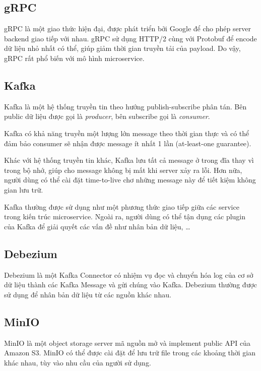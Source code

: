 \documentclass[./../main.tex]{subfiles}
\begin{document}
\hypertarget{grpc}{%
\subsection{gRPC}\label{grpc}}

gRPC \cite{Goo22} là một giao thức hiện đại, được phát triển bởi Google để cho phép
server backend giao tiếp với nhau. gRPC sử dụng HTTP/2 cùng với Protobuf
để encode dữ liệu nhỏ nhất có thể, giúp giảm thời gian truyền tải của
payload. Do vậy, gRPC rất phổ biến với mô hình microservice.

\hypertarget{kafka}{%
\subsection{Kafka}\label{kafka}}

Kafka \cite{Kaf22} là một hệ thống truyền tin theo hướng publish-subscribe phân tán.
Bên public dữ liệu được gọi là \emph{producer}, bên subscribe gọi là
\emph{consumer}.

Kafka có khả năng truyền một lượng lớn message theo thời gian thực và có
thể đảm bảo consumer sẽ nhận được message ít nhất 1 lần (at-least-one
guarantee).

Khác với hệ thống truyền tin khác, Kafka lưu tất cả message ở trong đĩa
thay vì trong bộ nhớ, giúp cho message không bị mất khi server xảy ra
lỗi. Hơn nữa, người dùng có thể cài đặt time-to-live chơ những message
này để tiết kiệm không gian lưu trữ.

Kafka thường được sử dụng như một phương thức giao tiếp giữa các service
trong kiến trúc microservice. Ngoài ra, người dùng có thể tận dụng các
plugin của Kafka để giải quyết các vấn đề như nhân bản dữ liệu, \ldots{}

\hypertarget{debezium}{%
\subsection{Debezium}\label{debezium}}

Debezium  \cite{Hat22} là một Kafka Connector có nhiệm vụ đọc và chuyển hóa log của cơ
sở dữ liệu thành các Kafka Message và gửi chúng vào Kafka. Debezium
thường được sử dụng để nhân bản dữ liệu từ các nguồn khác nhau.

\hypertarget{minio}{%
\subsection{MinIO}\label{minio}}

MinIO \cite{Min22} là một object storage server mã nguồn mở và implement public API
của Amazon S3. MinIO có thể được cài đặt để lưu trữ file trong các
khoảng thời gian khác nhau, tùy vào nhu cầu của người sử dụng.
\end{document}
